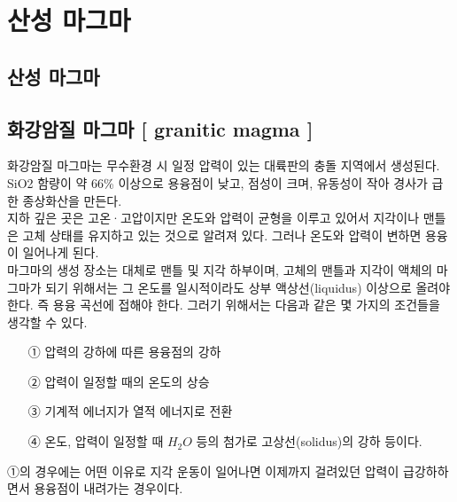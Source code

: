 \documentclass[12pt, a4paper, twoside]{book}
\begin{document}
	\clearpage
	\section{산성 마그마}





	\subsection{산성 마그마}


	\subsection{화강암질 마그마 [ granitic magma ] }

				화강암질 마그마는 무수환경 시 일정 압력이 있는 대륙판의 충돌 지역에서 생성된다. SiO2 함량이 약 66\% 이상으로 용융점이 낮고, 점성이 크며, 유동성이 작아 경사가 급한 종상화산을 만든다. \\
				
				지하 깊은 곳은 고온·고압이지만 온도와 압력이 균형을 이루고 있어서 지각이나 맨틀은 고체 상태를 유지하고 있는 것으로 알려져 있다. 그러나 온도와 압력이 변하면 용융이 일어나게 된다.  \\
				
				마그마의 생성 장소는 대체로 맨틀 및 지각 하부이며, 고체의 맨틀과 지각이 액체의 마그마가 되기 위해서는 그 온도를 일시적이라도 상부 액상선(liquidus) 이상으로 올려야 한다. 
				즉 용융 곡선에 접해야 한다. 
				그러기 위해서는 다음과 같은 몇 가지의 조건들을 생각할 수 있다.
				
				\begin{itemize}[topsep=0.0em, parsep=0.0em, itemsep=0em, leftmargin=6.0em, labelwidth=3em, labelsep=3em] 
				\item	[①] 	압력의 강하에 따른 용융점의 강하
				\item	[②] 	압력이 일정할 때의 온도의 상승
				\item	[③] 	기계적 에너지가 열적 에너지로 전환
				\item	[④]	온도, 압력이 일정할 때 $H_2O$ 등의 첨가로 고상선(solidus)의 강하 등이다.
				\end{itemize}
				
				
				①의 경우에는 어떤 이유로 지각 운동이 일어나면 이제까지 걸려있던 압력이 급강하하면서 용융점이 내려가는 경우이다. 
				
\end{document}
